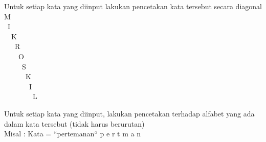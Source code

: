 \begin{pemrograman}
Untuk setiap kata yang diinput lakukan pencetakan kata tersebut secara diagonal \\
M \\
~I \\
~~K \\
~~~R \\
~~~~O \\
~~~~~S \\
~~~~~~K \\
~~~~~~~I \\
~~~~~~~~L \\
\end{pemrograman}


\begin{pemrograman}
Untuk setiap kata yang diinput, lakukan pencetakan terhadap alfabet yang ada dalam kata tersebut (tidak harus berurutan)  \\
Misal : Kata = ``pertemanan``
p e r t m a n \\
\end{pemrograman}


	
 
